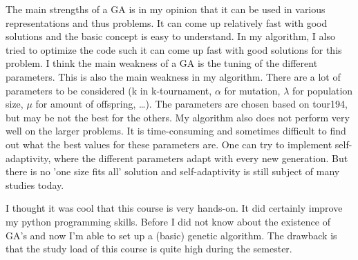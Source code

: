 \documentclass[a4paper,10pt]{article}
\newcommand{\ReplaceMe}[1]{{\color{blue}#1}}
\newcommand{\RemoveMe}[1]{{\color{purple}#1}}
\begin{document}

The main strengths of a GA is in my opinion that it can be used in various representations and thus problems. It can come up relatively fast with good solutions and the basic concept is easy to understand. In my algorithm, I also tried to optimize the code such it can come up fast with good solutions for this problem.
I think the main weakness of a GA is the tuning of the different parameters. This is also the main weakness in my algorithm. There are a lot of parameters to be considered (k in k-tournament, $\alpha$ for mutation, $\lambda$ for population size, $\mu$ for amount of offspring, \ldots). The parameters are chosen based on tour194, but may be not the best for the others. My algorithm also does not perform very well on the larger problems. It is time-consuming and sometimes difficult to find out what the best values for these parameters are. One can try to implement self-adaptivity, where the different parameters adapt with every new generation. But there is no 'one size fits all' solution and self-adaptivity is still subject of many studies today. 

I thought it was cool that this course is very hands-on. It did certainly improve my python programming skills. Before I did not know about the existence of GA's and now I'm able to set up a (basic) genetic algorithm. The drawback is that the study load of this course is quite high during the semester.







\end{document}

